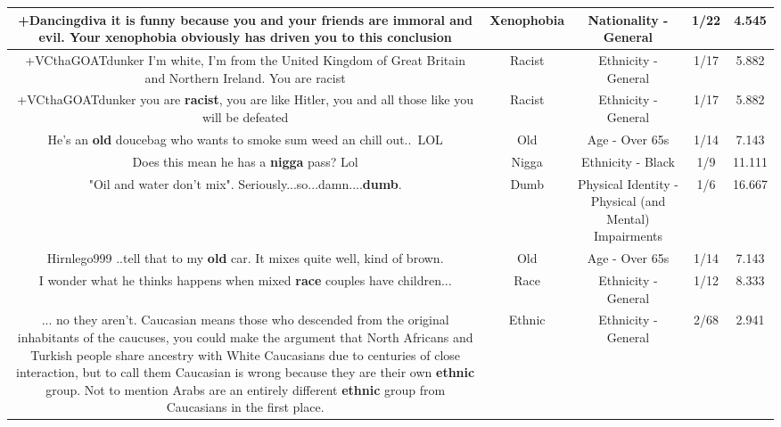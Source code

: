 \documentclass[11pt]{article}
\newlength\mylength
\begin{document}
\begin{center}
\begin{longtable}{|C{.65\mylength}|C{.30\mylength}|C{.12\mylength}|C{.12\mylength}|C{.12\mylength}|}
  \small +Dancingdiva it is funny because you and your friends are immoral and evil. Your \textbf{xenophobia} obviously has driven you to this conclusion\normalsize   & Xenophobia & Nationality - General & 1/22 & 4.545 \\  \hline
  \small +VCthaGOATdunker I'm white, I'm from the United Kingdom of Great Britain and Northern Ireland. You are racist\normalsize   & Racist & Ethnicity - General & 1/17 & 5.882 \\  \hline
  \small +VCthaGOATdunker you are \textbf{racist}, you are like Hitler, you and all those like you will be defeated\normalsize   & Racist & Ethnicity - General & 1/17 & 5.882 \\  \hline
  \small He's an \textbf{old} doucebag who wants to smoke sum weed an chill out.. LOL\normalsize   & Old & Age - Over 65s & 1/14 & 7.143 \\  \hline
  \small Does this mean he has a \textbf{nigga} pass? Lol\normalsize   & Nigga & Ethnicity - Black & 1/9 & 11.111 \\  \hline
  \small "Oil and water don't mix". Seriously...so...damn....\textbf{dumb}.\normalsize   & Dumb & Physical Identity - Physical (and Mental) Impairments & 1/6 & 16.667 \\  \hline
  \small Hirnlego999 ..tell that to my \textbf{old} car. It mixes quite well, kind of brown.\normalsize   & Old & Age - Over 65s & 1/14 & 7.143 \\  \hline
  \small I wonder what he thinks happens when mixed \textbf{race} couples have children...\normalsize   & Race & Ethnicity - General & 1/12 & 8.333 \\  \hline
  \small ... no they aren't. Caucasian means those who descended from the original inhabitants of the caucuses, you could make the argument that North Africans and Turkish people share ancestry with White Caucasians due to centuries of close interaction, but to call them Caucasian is wrong because they are their own \textbf{ethnic} group. Not to mention Arabs are an entirely different \textbf{ethnic} group from Caucasians in the first place.\normalsize   & Ethnic & Ethnicity - General & 2/68 & 2.941 \\  \hline

\end{longtable}
\end{center}
\end{document}

